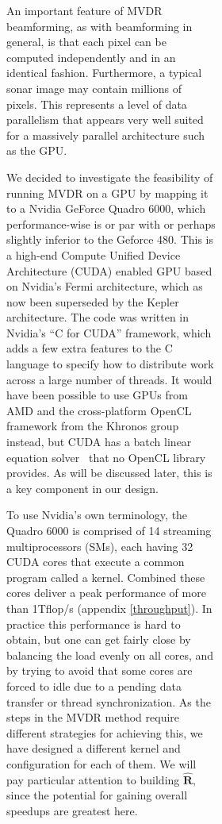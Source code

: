 \documentclass[12pt,journal,draftclsnofoot,onecolumn]{IEEEtran}
\newcommand\mat[1]{\boldsymbol{#1}}
\newcommand\1{\vec 1}
\newcommand*\eR{\mat{\hat R}}
\begin{document}
\begin{figure}[H]
\begin{figure}[!t]
\begin{figure}[!t]

An important feature of MVDR beamforming, as with beamforming in general, is that each pixel can be computed independently and in an identical fashion. Furthermore, a typical sonar image may contain millions of pixels. This represents a level of data parallelism that appears very well suited for a massively parallel architecture such as the GPU.

We decided to investigate the feasibility of running MVDR on a GPU by mapping it to a Nvidia GeForce Quadro 6000, which performance-wise is or par with or perhaps slightly inferior to the Geforce 480. This is a high-end Compute Unified Device Architecture (CUDA) enabled GPU based on Nvidia's Fermi architecture, which as now been superseded by the Kepler architecture. The code was written in Nvidia's ``C for CUDA'' framework, which adds a few extra features to the C language to specify how to distribute work across a large number of threads. It would have been possible to use GPUs from AMD and the cross-platform OpenCL framework from the Khronos group instead, but CUDA has a batch linear equation solver~\cite{Nvidia} that no OpenCL library provides. As will be discussed later, this is a key component in our design.

To use Nvidia's own terminology, the Quadro 6000 is comprised of 14 streaming multiprocessors (SMs), each having 32 CUDA cores that execute a common program called a kernel. Combined these cores deliver a peak performance of more than 1\;Tflop/s (appendix \ref{throughput}). In practice this performance is hard to obtain, but one can get fairly close by balancing the load evenly on all cores, and by trying to avoid that some cores are forced to idle due to a pending data transfer or thread synchronization. As the steps in the MVDR method require different strategies for achieving this, we have designed a different kernel and configuration for each of them. We will pay particular attention to building $\eR$, since the potential for gaining overall speedups are greatest here.


\end{figure}
\end{figure}
\end{figure}
\end{document}
